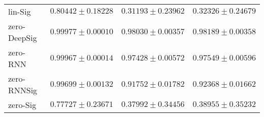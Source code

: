 \begin{tabular}{llll}
lin-Sig        &                           $ 0.80442 \pm 0.18228 $ &                           $ 0.31193 \pm 0.23962 $ &                           $ 0.32326 \pm 0.24679 $ \\
zero-DeepSig   &               $  \mathbf{ 0.99977 \pm 0.00010 } $ &                           $ 0.98030 \pm 0.00357 $ &                           $ 0.98189 \pm 0.00358 $ \\
zero-RNN       &                           $ 0.99967 \pm 0.00014 $ &                           $ 0.97428 \pm 0.00572 $ &                           $ 0.97549 \pm 0.00596 $ \\
zero-RNNSig    &                           $ 0.99699 \pm 0.00132 $ &                           $ 0.91752 \pm 0.01782 $ &                           $ 0.92368 \pm 0.01662 $ \\
zero-Sig       &                           $ 0.77727 \pm 0.23671 $ &                           $ 0.37992 \pm 0.34456 $ &                           $ 0.38955 \pm 0.35232 $ \\
\bottomrule
\end{tabular}
